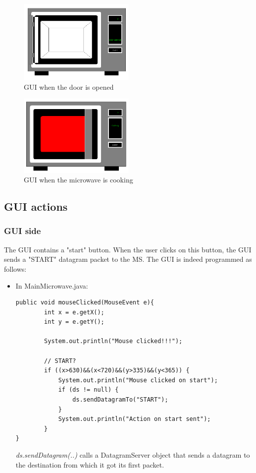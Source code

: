 \documentclass[12pt]{article}
\begin{document}
\begin{figure}[htbp]
\centering
\includegraphics[width=0.5\textwidth]{figures/animopen}
\caption{GUI when the door is opened} \label{fig:animopen}
\end{figure}

\begin{figure}[htbp]
\centering
\includegraphics[width=0.5\textwidth]{figures/animcooking}
\caption{GUI when the microwave is cooking} \label{fig:animcooking}
\end{figure}

\subsection{GUI actions}\label{sec:GUIActions}
\subsubsection{GUI side}
The GUI contains a "start" button.  When the user clicks on this button, the GUI sends a "START" datagram packet to the MS. The GUI is indeed programmed as follows:
\begin{itemize}
\item In MainMicrowave.java:
\begin{lstlisting}
public void mouseClicked(MouseEvent e){
        int x = e.getX();
        int y = e.getY();

        System.out.println("Mouse clicked!!!");

        // START?
        if ((x>630)&&(x<720)&&(y>335)&&(y<365)) {
            System.out.println("Mouse clicked on start");
            if (ds != null) {
                ds.sendDatagramTo("START");
            }
            System.out.println("Action on start sent");
        }
}
\end{lstlisting}
\textit{ds.sendDatagram(..)} calls a DatagramServer object that sends a datagram to the destination from which it got its first packet.
\end{itemize}
\end{document}
